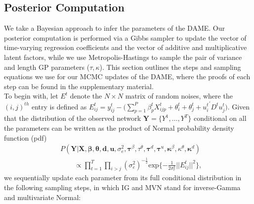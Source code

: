 \documentclass[a4paper]{article}
\begin{document}
\subsection{Posterior Computation}\label{subsec: posterior computation}
We take a Bayesian approach to infer the parameters of the DAME. Our posterior computation is performed via a Gibbs sampler to update the vector of time-varying regression coefficients and the vector of additive and multiplicative latent factors, while we use Metropolis-Hastings to sample the pair of variance and length GP parameters ($\tau, \kappa$). This section outlines the steps and sampling equations we use for our MCMC updates of the DAME, where the proofs of each step can be found in the supplementary material.\\ \newline
To begin with, let $E^t$ denote the $N \times N$ matrix of random noises, where the $(i, j)^{th}$ entry is defined as $E^t_{ij} = y^t_{ij}-\big(\sum\limits_{p=1}^P \beta^t_{p}X^t_{ijp}+\theta^t_{i}+\theta^t_{j}+{u^t_{i}}^\prime D^tu^t_{j}\big)$. Given that the distribution of the observed network $\mathbf{Y}= \{Y^1,\ldots,Y^T\}$ conditional on all the parameters can be written as the product of Normal probability density function (pdf)
\begin{equation}
\begin{aligned}
	&P(\mathbf{Y}|\mathbf{X}, \boldsymbol{\beta}, \boldsymbol{\theta}, \boldsymbol{d}, \boldsymbol{u},\sigma_e^2, \boldsymbol\tau^{\beta}, \tau^{\theta}, \boldsymbol\tau^{d}, \boldsymbol\tau^{u}, \boldsymbol\kappa^\beta, \kappa^\theta, \boldsymbol\kappa^d)\\&\quad\quad\propto  \prod_{t=1}^T\prod_{i>j}(\sigma_e^2)^{-\frac{1}{2}}\mbox{exp}\{-\frac{1}{2\sigma_e^2}||E^t_{ij}||^2\},
	\end{aligned}
\end{equation}
we sequentially update each parameter from its full conditional distribution in the following sampling steps, in which IG and MVN stand for inverse-Gamma and multivariate Normal:
\end{document}
